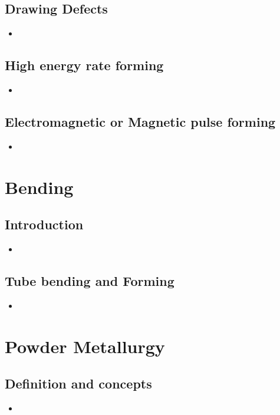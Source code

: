 \documentclass[8pt]{report}
\begin{document}
\section{Drawing Defects}
	\begin{itemize}
		\item
	\end{itemize}\hrulefill
\section{High energy rate forming}
	\begin{itemize}
		\item
	\end{itemize}\hrulefill
\section{Electromagnetic or Magnetic pulse forming}
	\begin{itemize}
		\item
	\end{itemize}\hrulefill
\chapter{Bending}
\section{Introduction}
	\begin{itemize}
		\item
	\end{itemize}\hrulefill
\section{Tube bending and Forming}
	\begin{itemize}
		\item
	\end{itemize}\hrulefill
\chapter{Powder Metallurgy}
\section{Definition and concepts}
	\begin{itemize}
		\item
	\end{itemize}\hrulefill
\end{document}
